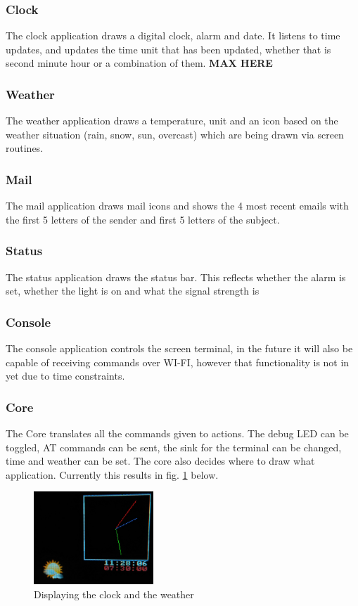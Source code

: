 \subsubsection{Clock}
The clock application draws a digital clock, alarm and date. It listens to time updates, and updates the time unit that has been updated, whether that is second minute hour or a combination of them. \textbf{MAX HERE}
\subsubsection{Weather}
The weather application draws a temperature, unit and an icon based on the weather situation (rain, snow, sun, overcast) which are being drawn via screen routines. 
\subsubsection{Mail}
The mail application draws mail icons and shows the 4 most recent emails with the first 5 letters of the sender and first 5 letters of the subject.
\subsubsection{Status}
The status application draws the status bar. This reflects whether the alarm is set, whether the light is on and what the signal strength is
\subsubsection{Console}
The console application controls the screen terminal, in the future it will also be capable of receiving commands over WI-FI, however that functionality is not in yet due to time constraints.
\subsubsection{Core}
The Core translates all the commands given to actions. The debug LED can be toggled, AT commands can be sent, the sink for the terminal can be changed, time and weather can be set. The core also decides where to draw what application. Currently this results in fig. \ref{fig:clock_weather} below.
\begin{figure}[H]
	\centering
	\label{fig:clock_weather}
	\includegraphics[width=0.4\textwidth]{./fig/clock_weather.png}
	\caption{Displaying the clock and the weather}
\end{figure}

